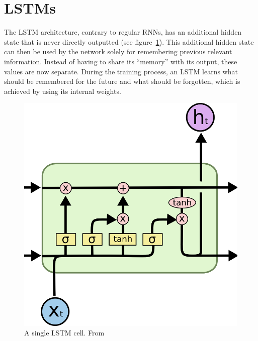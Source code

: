 \section{LSTMs}

The LSTM architecture, contrary to regular RNNs, has an additional hidden state that is never directly outputted (see figure~\ref{fig:lstm_cell}). This additional hidden state can then be used by the network solely for remembering previous relevant information. Instead of having to share its \enquote{memory} with its output, these values are now separate. During the training process, an LSTM learns what should be remembered for the future and what should be forgotten, which is achieved by using its internal weights.

\begin{figure}[H]
	\begin{center}
		\includegraphics[scale=0.5]{rnn/lstm_cell}
	\end{center}
	\caption{A single LSTM cell. From~\cite{olah2015understanding}\label{fig:lstm_cell}}
\end{figure}

